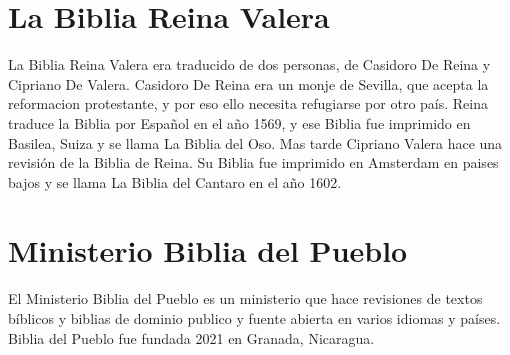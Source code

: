 \hypertarget{la-biblia-reina-valera}{%
\section{La Biblia Reina Valera}\label{la-biblia-reina-valera}}

La Biblia Reina Valera era traducido de dos personas, de Casidoro De
Reina y Cipriano De Valera. Casidoro De Reina era un monje de Sevilla,
que acepta la reformacion protestante, y por eso ello necesita
refugiarse por otro país. Reina traduce la Biblia por Español en el año
1569, y ese Biblia fue imprimido en Basilea, Suiza y se llama La Biblia
del Oso. Mas tarde Cipriano Valera hace una revisión de la Biblia de
Reina. Su Biblia fue imprimido en Amsterdam en paises bajos y se llama
La Biblia del Cantaro en el año 1602.

\hypertarget{ministerio-biblia-del-pueblo}{%
\section{Ministerio Biblia del
Pueblo}\label{ministerio-biblia-del-pueblo}}

El Ministerio Biblia del Pueblo es un ministerio que hace revisiones de
textos bíblicos y biblias de dominio publico y fuente abierta en varios
idiomas y países. Biblia del Pueblo fue fundada 2021 en Granada,
Nicaragua.
